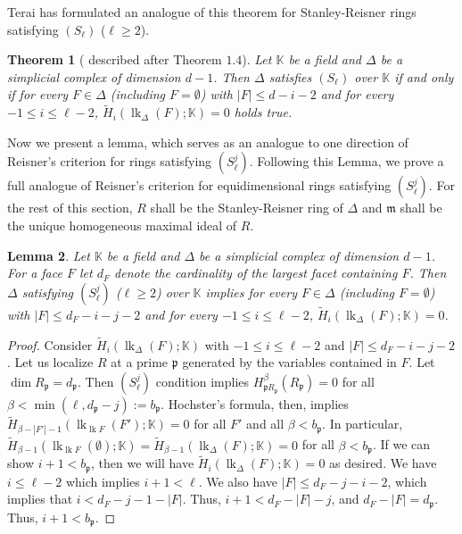 \documentclass[11pt]{amsart}
\numberwithin{equation}{section}
\newtheorem{theorem}{Theorem}[section]
\newtheorem{lemma}[theorem]{Lemma}
\theoremstyle{definition}
\theoremstyle{remark}
\newcommand{\lk}{\operatorname{lk}}
\begin{document}
Terai has formulated an analogue of this theorem for Stanley-Reisner rings satisfying $(S_\ell)$ ($\ell \geq 2$). 

\begin{theorem}[\cite{Te07} described after Theorem $1.4$]
Let $\mathbb{K}$ be a field and $\Delta$ be a simplicial complex of dimension $d - 1$. Then $\Delta$ satisfies $(S_\ell)$ over
$\mathbb{K}$ if and only if for every $F \in \Delta$ (including $F = \emptyset$) with $|F| \leq d-i-2$ and for every $-1\leq i \leq \ell-2$, $\tilde{H}_i(\lk_{\Delta}(F);\mathbb{K}) = 0$ holds true.
\end{theorem}

Now we present a lemma, which serves as an analogue to one direction of Reisner's criterion for rings satisfying $(S_\ell^j)$.  Following this Lemma, we prove a full analogue of Reisner's criterion for equidimensional rings satisfying $(S_\ell^j)$.  For the rest of this section, $R$ shall be the Stanley-Reisner ring of $\Delta$ and $\mathfrak{m}$ shall be the unique homogeneous maximal ideal of $R$.

\begin{lemma}
Let $\mathbb{K}$ be a field and $\Delta$ be a simplicial complex of dimension $d - 1$.  For a face $F$ let $d_F$ denote the cardinality of the largest facet containing $F$. Then $\Delta$ satisfying $(S_\ell^j)$ ($\ell \geq 2$) over
$\mathbb{K}$ implies for every $F \in \Delta$ (including $F = \emptyset$) with $|F| \leq d_F-i-j-2$ and for every $-1\leq i \leq \ell-2$, $\tilde{H}_i(\lk_{\Delta}(F);\mathbb{K}) = 0$.

\end{lemma}

\begin{proof}
Consider $\tilde{H}_{i}(\lk_{\Delta}(F);\mathbb{K})$ with $-1 \leq i \leq \ell-2$ and $|F| \leq d_F-i-j-2$.  Let us localize $R$ at a prime $\mathfrak{p}$ generated by the variables contained in $F$.  Let $\dim R_\mathfrak{p} = d_\mathfrak{p}$.  Then $(S_\ell^j)$ condition implies $H_{\mathfrak{p}R_\mathfrak{p}}^{\beta} (R_\mathfrak{p}) = 0$ for all $\beta < \min (\ell, d_\mathfrak{p}-j):=b_\mathfrak{p}$.  
Hochster's formula, then, implies $\tilde{H}_{\beta - |F'|-1}(\lk_{\lk F}(F');\mathbb{K}) = 0$ for all $F'$ and all $\beta < b_\mathfrak{p}$.  In particular, $\tilde{H}_{\beta -1}(\lk_{\lk F}(\emptyset);\mathbb{K}) = \tilde{H}_{\beta-1}(\lk_{\Delta}(F);\mathbb{K}) = 0$ for all $\beta < b_\mathfrak{p}$.  If we can show $i+1 < b_\mathfrak{p}$, then we will have $\tilde{H}_{i}(\lk_{\Delta}(F);\mathbb{K}) = 0$ as desired.  We have $i \leq \ell-2$ which implies $i+1 < \ell$.  We also have $|F| \leq d_F-j-i-2$, which implies that $i < d_F-j-1-|F|$.  Thus, $i+1 < d_F-|F|-j$, and $d_F-|F| = d_\mathfrak{p}$.  Thus, $i+1 < b_\mathfrak{p}$.
\end{proof}
\end{document}
